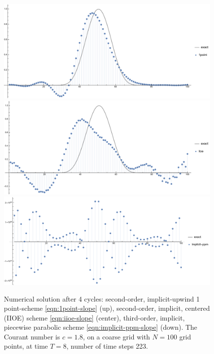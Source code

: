 \documentclass[../thesis.tex]{subfiles}
\begin{document}
\begin{figure}[H]
	\centering
	\includegraphics[width=\textwidth]{fig-1point-c1p8-T8-limit0-smooth.pdf}
	\includegraphics[width=\textwidth]{fig-iioe-c1p8-T8-limit0-smooth.pdf}
	\includegraphics[width=\textwidth]{fig-implicit-ppm-c1p8-T8-limit0-smooth.pdf}
	\caption{Numerical solution after 4 cycles: second-order, implicit-upwind 1 point-scheme \eqref{eqn:1point-slope} (up), second-order, implicit, centered (IIOE) scheme \eqref{eqn:iioe-slope} (center), third-order, implicit, piecewise parabolic scheme \eqref{eqn:implicit-ppm-slope} (down). The Courant number is \(c = 1.8\), on a coarse grid with \(N = 100\) grid points, at time \(T = 8\), number of time steps 223.}
	\label{fig:c1p8-T8-limit0-smooth}
\end{figure}
\end{document}
